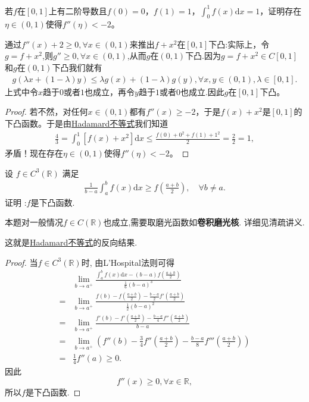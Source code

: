 \documentclass[../../main.tex]{subfiles}
\begin{document}
\begin{example}
若$f$在$[0,1]$上有二阶导数且$f(0) = 0$，$f(1) = 1$，$\int_0^1 f(x)\mathrm{d}x = 1$，证明存在$\eta\in(0,1)$使得$f''(\eta)< -2$。
\end{example}
\begin{remark}
通过$f''(x)+2\geqslant  0,\forall x\in(0,1)$来推出$f + x^2$在$[0,1]$下凸:实际上，令$g=f+x^2$,则$g''\geqslant  0,\forall x\in(0,1)$,从而$g$在$(0,1)$下凸.因为$g = f + x^2\in C[0,1]$和$g$在$(0,1)$下凸我们就有
\begin{align*}
g(\lambda x + (1 - \lambda)y)\leqslant \lambda g(x) + (1 - \lambda)g(y),\forall x,y\in(0,1),\lambda\in[0,1].
\end{align*}
上式中令$x$趋于$0$或者$1$也成立，再令$y$趋于$1$或者$0$也成立.因此$g$在$[0,1]$下凸。 
\end{remark}
\begin{proof}
若不然，对任何$x\in(0,1)$都有$f''(x)\geqslant  -2$，于是$f(x) + x^2$是$[0,1]$的下凸函数。于是由\hyperref[theorem:Hadamard不等式]{Hadamard不等式}我们知道
\begin{align*}
\frac{4}{3}=\int_0^1 [f(x) + x^2]\mathrm{d}x\leqslant \frac{f(0) + 0^2 + f(1) + 1^2}{2}=\frac{2}{2}=1,
\end{align*}
矛盾！现在存在$\eta\in(0,1)$使得$f''(\eta)< -2$。

\end{proof}

\begin{proposition}
设 \(f\in C^3(\mathbb{R})\) 满足
\begin{align*}
\frac{1}{b - a}\int_{a}^{b}f(x)\mathrm{d}x \geqslant f\left(\frac{a + b}{2}\right),\quad \forall b\neq a.
\end{align*}
证明 :\(f\)是下凸函数. 
\end{proposition}
\begin{remark}
本题对一般情况$f\in C(\mathbb{R})$也成立,需要取磨光函数如\textbf{卷积磨光核}. 详细见清疏讲义.
\end{remark}
\begin{note}
这就是\hyperref[theorem:Hadamard不等式]{Hadamard不等式}的反向结果.
\end{note}
\begin{proof}
当\(f\in C^{3}(\mathbb{R})\)时, 由L'Hospital法则可得
\begin{align*}
&\lim_{b\to a^+}\frac{\int_{a}^{b}f(x)\mathrm{d}x - (b - a)f(\frac{a + b}{2})}{\frac{1}{6}(b - a)^3}\\
=&\lim_{b\to a^+}\frac{f(b)-f(\frac{a + b}{2})-\frac{b - a}{2}f'(\frac{a + b}{2})}{\frac{1}{2}(b - a)^2}\\
=&\lim_{b\to a^+}\frac{f'(b)-f'(\frac{a + b}{2})-\frac{b - a}{4}f''(\frac{a + b}{2})}{b - a}\\
=&\lim_{b\to a^+}\left(f''(b)-\frac{3}{4}f''\left(\frac{a + b}{2}\right)-\frac{b - a}{8}f''' \left(\frac{a + b}{2}\right)\right)\\
=&\frac{1}{4}f''(a)\geqslant 0.
\end{align*}
因此
\[f''(x)\geqslant 0,\forall x\in \mathbb{R},\]
所以\(f\)是下凸函数.

\end{proof}
\end{document}
